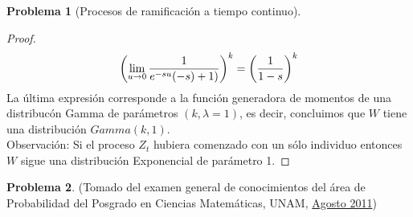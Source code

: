 \documentclass[a5paper,oneside]{amsart}
\theoremstyle{plain}
\theoremstyle{definition}
\newtheorem{problema}{Problema}
\begin{document}
\begin{problema}[Procesos de ramificaci\'on a tiempo continuo]
\begin{enumerate}
\begin{proof}
$$
\left( \lim_{u \rightarrow 0}\frac{1}{e^{-su}(-s)+1)}\right) ^k=\left( \frac{1}{1-s}\right) ^k
$$
La \'ultima expresi\'on corresponde a la funci\'on generadora de momentos de una distribuc\'on Gamma de par\'ametros $(k,\lambda=1)$, es decir, concluimos que $W$ tiene una distribuci\'on $Gamma(k,1)$.\\
Observaci\'on: Si el proceso $Z_t$ hubiera comenzado con un s\'olo  individuo entonces $W$ sigue una distribuci\'on Exponencial de par\'ametro 1.
\end{proof}
\end{enumerate}
\end{problema}
\begin{problema}
(Tomado del examen general de conocimientos del \'area de Probabilidad del Posgrado en Ciencias Matem\'aticas, UNAM, \href{http://www.posgradomatematicas.unam.mx/contenidoEstatico/archivo/files/pdf/Examenes_Generales/Probabilidad/Probabilidad2011-2.pdf}{Agosto 2011})


\end{problema}
\end{document}
